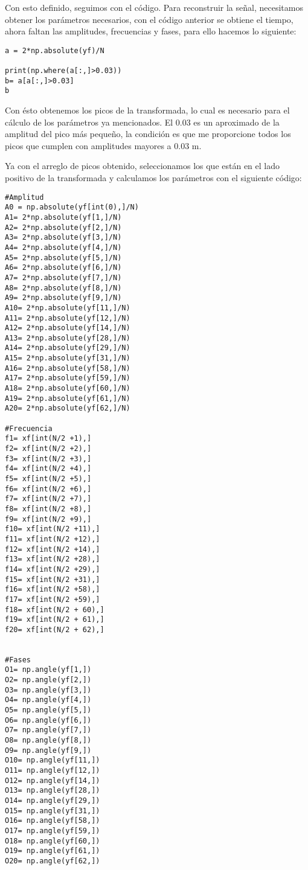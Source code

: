 \documentclass[12pt]{article}
\begin{document}
\begin{doublespace}
Con esto definido, seguimos con el código. Para reconstruir la señal, necesitamos obtener los parámetros necesarios, con el código anterior se obtiene el tiempo, ahora faltan las amplitudes, frecuencias y fases, para ello hacemos lo siguiente:

\begin{verbatim}
a = 2*np.absolute(yf)/N

print(np.where(a[:,]>0.03))
b= a[a[:,]>0.03]
b
\end{verbatim}

Con ésto obtenemos los picos de la transformada, lo cual es necesario para el cálculo de los parámetros ya mencionados. El 0.03 es un aproximado de la amplitud del pico más pequeño, la condición es que me proporcione todos los picos que cumplen con amplitudes mayores a 0.03 m. 

Ya con el arreglo de picos obtenido, seleccionamos los que están en el lado positivo de la transformada y calculamos los parámetros con el siguiente código:

\begin{verbatim}
#Amplitud
A0 = np.absolute(yf[int(0),]/N)
A1= 2*np.absolute(yf[1,]/N)
A2= 2*np.absolute(yf[2,]/N)
A3= 2*np.absolute(yf[3,]/N)
A4= 2*np.absolute(yf[4,]/N)
A5= 2*np.absolute(yf[5,]/N)
A6= 2*np.absolute(yf[6,]/N)
A7= 2*np.absolute(yf[7,]/N)
A8= 2*np.absolute(yf[8,]/N)
A9= 2*np.absolute(yf[9,]/N)
A10= 2*np.absolute(yf[11,]/N)
A11= 2*np.absolute(yf[12,]/N)
A12= 2*np.absolute(yf[14,]/N)
A13= 2*np.absolute(yf[28,]/N)
A14= 2*np.absolute(yf[29,]/N)
A15= 2*np.absolute(yf[31,]/N)
A16= 2*np.absolute(yf[58,]/N)
A17= 2*np.absolute(yf[59,]/N)
A18= 2*np.absolute(yf[60,]/N)
A19= 2*np.absolute(yf[61,]/N)
A20= 2*np.absolute(yf[62,]/N)

#Frecuencia
f1= xf[int(N/2 +1),]
f2= xf[int(N/2 +2),]
f3= xf[int(N/2 +3),]
f4= xf[int(N/2 +4),]
f5= xf[int(N/2 +5),]
f6= xf[int(N/2 +6),]
f7= xf[int(N/2 +7),]
f8= xf[int(N/2 +8),]
f9= xf[int(N/2 +9),]
f10= xf[int(N/2 +11),]
f11= xf[int(N/2 +12),]
f12= xf[int(N/2 +14),]
f13= xf[int(N/2 +28),]
f14= xf[int(N/2 +29),]
f15= xf[int(N/2 +31),]
f16= xf[int(N/2 +58),]
f17= xf[int(N/2 +59),]
f18= xf[int(N/2 + 60),]
f19= xf[int(N/2 + 61),]
f20= xf[int(N/2 + 62),]


#Fases
O1= np.angle(yf[1,])
O2= np.angle(yf[2,])
O3= np.angle(yf[3,])
O4= np.angle(yf[4,])
O5= np.angle(yf[5,])
O6= np.angle(yf[6,])
O7= np.angle(yf[7,])
O8= np.angle(yf[8,])
O9= np.angle(yf[9,])
O10= np.angle(yf[11,])
O11= np.angle(yf[12,])
O12= np.angle(yf[14,])
O13= np.angle(yf[28,])
O14= np.angle(yf[29,])
O15= np.angle(yf[31,])
O16= np.angle(yf[58,])
O17= np.angle(yf[59,])
O18= np.angle(yf[60,])
O19= np.angle(yf[61,])
O20= np.angle(yf[62,])
\end{verbatim}


\end{doublespace}
\end{document}
